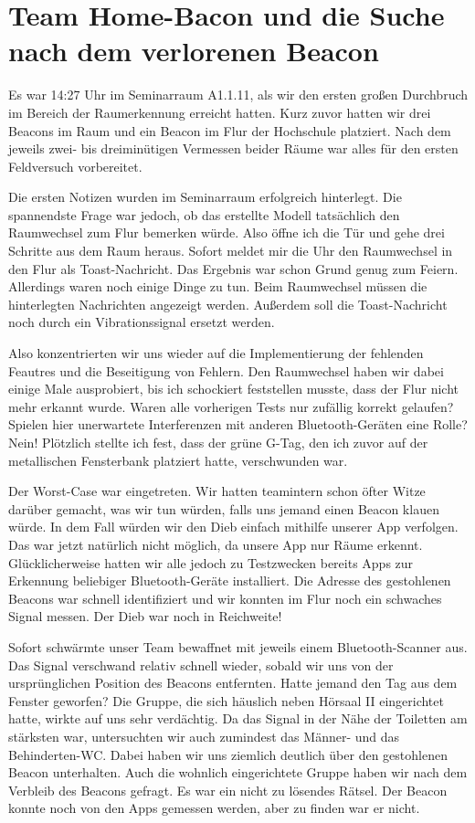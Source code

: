 \section{Team Home-Bacon und die Suche nach dem verlorenen Beacon}

Es war 14:27 Uhr im Seminarraum A1.1.11, als wir den ersten großen Durchbruch
im Bereich der Raumerkennung erreicht hatten. Kurz zuvor hatten wir drei Beacons
im Raum und ein Beacon im Flur der Hochschule platziert. Nach dem jeweils
zwei- bis dreiminütigen Vermessen beider Räume war alles für den ersten
Feldversuch vorbereitet.

Die ersten Notizen wurden im Seminarraum erfolgreich hinterlegt. Die spannendste
Frage war jedoch, ob das erstellte Modell tatsächlich den Raumwechsel zum Flur 
bemerken würde. Also öffne ich die Tür und gehe drei Schritte aus dem Raum heraus.
Sofort meldet mir die Uhr den Raumwechsel in den Flur als Toast-Nachricht. Das 
Ergebnis war schon Grund genug zum Feiern. Allerdings waren noch einige Dinge
zu tun. Beim Raumwechsel müssen die hinterlegten Nachrichten angezeigt werden.
Außerdem soll die Toast-Nachricht noch durch ein Vibrationssignal ersetzt werden.

Also konzentrierten wir uns wieder auf die Implementierung der fehlenden
Feautres und die Beseitigung von Fehlern. Den Raumwechsel haben wir dabei einige
Male ausprobiert, bis ich schockiert feststellen musste, dass der Flur nicht
mehr erkannt wurde. Waren alle vorherigen Tests nur zufällig korrekt gelaufen?
Spielen hier unerwartete Interferenzen mit anderen Bluetooth-Geräten eine Rolle?
Nein! Plötzlich stellte ich fest, dass der grüne G-Tag, den ich zuvor auf der
metallischen Fensterbank platziert hatte, verschwunden war.

Der Worst-Case war eingetreten. Wir hatten teamintern schon öfter Witze darüber
gemacht, was wir tun würden, falls uns jemand einen Beacon klauen würde.
In dem Fall würden wir den Dieb einfach mithilfe unserer App verfolgen.
Das war jetzt natürlich nicht möglich, da unsere App nur Räume erkennt.
Glücklicherweise hatten wir alle jedoch zu Testzwecken bereits Apps zur Erkennung
beliebiger Bluetooth-Geräte installiert. Die Adresse des gestohlenen Beacons
war schnell identifiziert und wir konnten im Flur noch ein schwaches Signal
messen. Der Dieb war noch in Reichweite!

Sofort schwärmte unser Team bewaffnet mit jeweils einem Bluetooth-Scanner aus.
Das Signal verschwand relativ schnell wieder, sobald wir uns von der ursprünglichen
Position des Beacons entfernten. Hatte jemand den Tag aus dem Fenster geworfen?
Die Gruppe, die sich häuslich neben Hörsaal II eingerichtet hatte, wirkte auf uns
sehr verdächtig. Da das Signal in der Nähe der Toiletten am stärksten war,
untersuchten wir auch zumindest das Männer- und das Behinderten-WC. Dabei haben wir
uns ziemlich deutlich über den gestohlenen Beacon unterhalten. Auch die
wohnlich eingerichtete Gruppe haben wir nach dem Verbleib des Beacons gefragt.
Es war ein nicht zu lösendes Rätsel. Der Beacon konnte noch von den Apps gemessen
werden, aber zu finden war er nicht.

